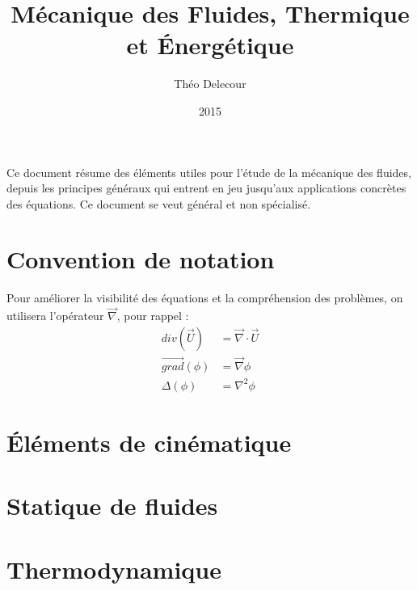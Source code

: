 \documentclass[10pt,a4paper,twocolumn,fleqn]{article}
\title{Mécanique des Fluides, Thermique et Énergétique}
\author{Théo Delecour}
\date{2015}
\begin{document}
\makeatletter

\begin{center}
 \LARGE \@title

 \Large \@author
\end{center}

\makeatother

Ce document résume des éléments utiles pour l'étude de la mécanique des fluides, depuis les principes généraux qui entrent en jeu jusqu'aux applications concrètes des équations. Ce document se veut général et non spécialisé.



\section*{Convention de notation}
Pour améliorer la visibilité des équations et la compréhension des problèmes, on utilisera l'opérateur $\vec{\nabla}$, pour rappel :
%
\begin{equation*}
\begin{aligned}
div (\vec{U}) &= \vec{\nabla} \cdot \vec{U} \\
\vec{grad} (\phi) &= \vec{\nabla} \phi \\
\Delta (\phi) &= \nabla^2 \phi
\end{aligned}
\end{equation*}



\section{Éléments de cinématique}


\section{Statique de fluides}\label{sec:statique} %


\section{Thermodynamique}

\end{document}
